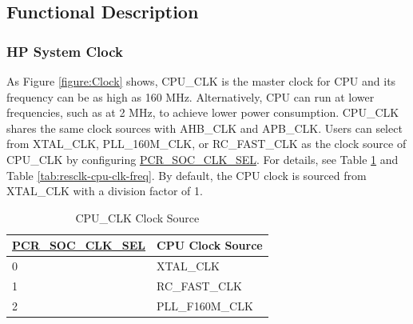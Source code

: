 \documentclass[main\_\_EN.tex]{subfiles}
\begin{document}
\subsection{Functional Description}

\subsubsection{HP System Clock}

As Figure \ref{figure:Clock} shows, CPU\_CLK is the master clock for CPU and its frequency can be as high as 160 MHz. Alternatively, CPU can run at lower frequencies, such as at 2 MHz, to achieve lower power consumption. CPU\_CLK shares the same clock sources with AHB\_CLK and APB\_CLK. Users can select from XTAL\_CLK, PLL\_160M\_CLK, or RC\_FAST\_CLK as the clock source of CPU\_CLK by configuring  \hyperref[fielddesc:PCRSOCCLKSEL]{PCR\_SOC\_CLK\_SEL}. For details, see Table  \ref{tab:resclk-cpu-clk-src} and Table \ref{tab:resclk-cpu-clk-freq}. By default, the CPU clock is sourced from XTAL\_CLK with a division factor of 1.

\begin{longtable}[c]{|p{5cm}|p{5cm}| }
       \caption{CPU\_CLK Clock Source}
		\label{tab:resclk-cpu-clk-src} \\
	    \hline
        \rowcolor{lightgray}
        \textbf{\hyperref[fielddesc:PCRSOCCLKSEL]{PCR\_SOC\_CLK\_SEL}} & \textbf{CPU Clock Source} \\
        \hline
        0 & XTAL\_CLK \\
        \hline
        1 & RC\_FAST\_CLK \\
        \hline
        2 & PLL\_F160M\_CLK \\
        \hline
\end{longtable}
\end{document}
